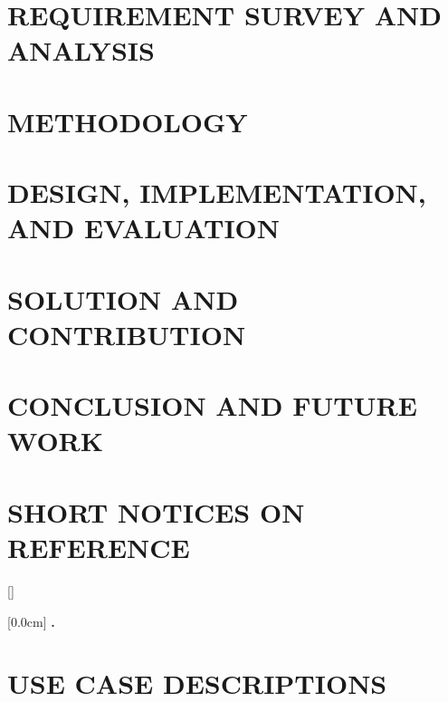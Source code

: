 \documentclass[a4paper,13pt,3p,twoside]{report}
\renewcommand{\figurename}{Figure}
\renewcommand{\tablename}{Table}
\renewcommand{\chaptername}{CHAPTER}
\theoremstyle{definition}
\begin{document}
\chapter{REQUIREMENT SURVEY AND ANALYSIS}
\label{chapter:Related_works}


\newpage
\chapter{METHODOLOGY}
\label{chapter:Methodology}


\newpage
\chapter{DESIGN, IMPLEMENTATION, AND EVALUATION}
\label{chapter:Experiment}


\newpage
\chapter{SOLUTION AND CONTRIBUTION}
\label{chapter:SolutionAndContribution}


\newpage
\chapter{CONCLUSION AND FUTURE WORK}
\label{chapter:conclusion}


\newpage
\chapter*{SHORT NOTICES ON REFERENCE}
\label{chapter:reference}


\newpage
\renewcommand\bibname{REFERENCE}



\appendixpage
\appendices
\addappheadtotoc
\renewcommand{\figurename}{Figure}
\renewcommand{\tablename}{Table}
\renewcommand{\chaptername}{CHAPTER}

[]
\titlespacing*{\chapter}{0pt}{-20pt}{20pt}

    [0.0cm]
    {\bfseries\vspace{0.3cm}}
    {{\bfseries{\scshape} \thecontentslabel.\ }}
    {}
    {\contentspage}

\chapter{USE CASE DESCRIPTIONS}

\end{document}
